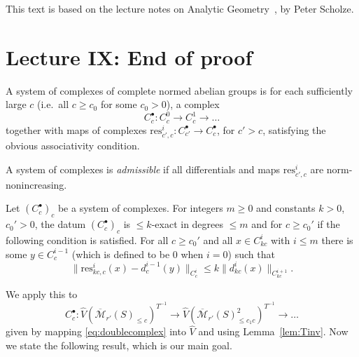 \maketitle

\begin{remark}
	This text is based on the lecture notes on Analytic Geometry~\cite{Analytic},
	by Peter Scholze.
\end{remark}

\section{Lecture IX: End of proof}


\begin{definition}
  \label{system_of_complexes}
  A system of complexes of complete normed abelian groups
  is for each sufficiently large $c$ (i.e.~all $c\geq c_0$ for some $c_0>0$),
  a complex
  \[
  C_c^\bullet: C_c^0\to C_c^1\to\ldots
  \]
  together with maps of complexes
  $\mathrm{res}_{c',c}^i: C_{c'}^\bullet\to C_c^\bullet$,
  for $c'>c$,
  satisfying the obvious associativity condition.
\end{definition}

\begin{definition}
  \label{admissible}
  A system of complexes is \emph{admissible}
  if all differentials and maps $\mathrm{res}_{c',c}^i$ are norm-nonincreasing.
\end{definition}

\begin{definition}
  \label{is_bdd_exact_for_bdd_degree_above_idx}
  Let $(C_c^\bullet)_c$ be a system of complexes.
  For integers $m\geq 0$ and constants $k>0$, $c_0'>0$,
  the datum $(C_c^\bullet)_c$ is
  $\leq k$-exact in degrees $\leq m$ and for $c\geq c_0'$ if the following condition is satisfied.
  For all $c\geq c_0'$ and all $x\in C_{kc}^i$ with $i\leq m$
  there is some $y\in C_c^{i-1}$ (which is defined to be $0$ when $i=0$) such that
  \[
    \|\mathrm{res}_{kc,c}^i(x)-d_c^{i-1}(y)\|_{C_c^i}\leq k\|d_{kc}^i(x)\|_{C_{kc}^{i+1}}.
  \]
\end{definition}

We apply this to
\[
C_c^\bullet: \widehat{V}(\overline{\mathcal M}_{r'}(S)_{\leq c})^{T^{-1}}\to \widehat{V}(\overline{\mathcal M}_{r'}(S)_{\leq c_1c}^2)^{T^{-1}}\to \ldots
\]
given by mapping \eqref{eq:doublecomplex} into $\hat{V}$ and using Lemma~\ref{lem:Tinv}.
Now we state the following result, which is our main goal.

